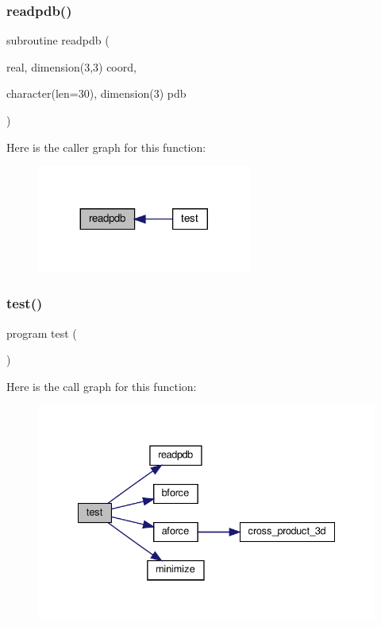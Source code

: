 \subsubsection{\texorpdfstring{readpdb()}{readpdb()}}
{\footnotesize\ttfamily subroutine readpdb (\begin{DoxyParamCaption}\item[{real, dimension(3,3)}]{coord,  }\item[{character(len=30), dimension(3)}]{pdb }\end{DoxyParamCaption})}

Here is the caller graph for this function\+:
\nopagebreak
\begin{figure}[H]
\begin{center}
\leavevmode
\includegraphics[width=200pt]{water__optimize_8f90_aa6798098feec21c5053572f5c5043c28_icgraph}
\end{center}
\end{figure}
\mbox{\label{water__optimize_8f90_a9bc57b8dbe7c3e1b9db72b918a1b6bab}} 
\subsubsection{\texorpdfstring{test()}{test()}}
{\footnotesize\ttfamily program test (\begin{DoxyParamCaption}{ }\end{DoxyParamCaption})}

Here is the call graph for this function\+:
\nopagebreak
\begin{figure}[H]
\begin{center}
\leavevmode
\includegraphics[width=335pt]{water__optimize_8f90_a9bc57b8dbe7c3e1b9db72b918a1b6bab_cgraph}
\end{center}
\end{figure}
